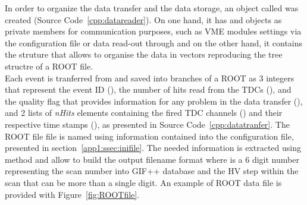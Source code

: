 	In order to organize the data transfer and the data storage, an object called  was created (Source Code~\ref{cpp:datareader}). On one hand, it has  and  objects as private members for communication purposes, such as VME modules settings via the configuration file  or data read-out through  and on the other hand, it contains the struture  that allows to organise the data in vectors reproducing the tree structre of a ROOT file.\\
    Each event is tranferred from  and saved into branches of a ROOT  as 3 integers that represent the event ID (), the number of hits read from the TDCs (), and the quality flag that provides information for any problem in the data transfer (), and 2 lists of \textit{nHits} elements containing the fired TDC channels () and their respective time stamps (), as presented in Source Code~\ref{cpp:datatranfer}. The ROOT file file is named using information contained into the configuration file, presented in section~\ref{app1:ssec:inifile}. The needed information is extracted using method  and allow to build the output filename format  where  is a 6 digit number representing the scan number into GIF++ database and  the HV step within the scan that can be more than a single digit. An example of ROOT data file is provided with Figure~\ref{fig:ROOTfile}.\\
    
